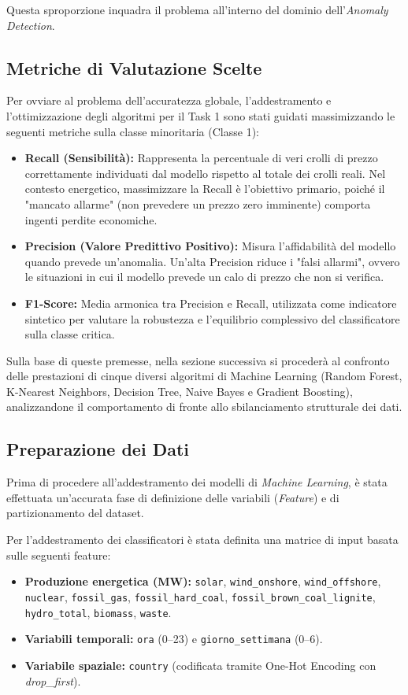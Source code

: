 Questa sproporzione inquadra il problema all'interno del dominio dell'\textit{Anomaly Detection}. 

\subsection{Metriche di Valutazione Scelte}
Per ovviare al problema dell'accuratezza globale, l'addestramento e l'ottimizzazione degli algoritmi per il Task 1 sono stati guidati massimizzando le seguenti metriche sulla classe minoritaria (Classe 1):

\begin{itemize}
    \item \textbf{Recall (Sensibilità):} Rappresenta la percentuale di veri crolli di prezzo correttamente individuati dal modello rispetto al totale dei crolli reali. Nel contesto energetico, massimizzare la Recall è l'obiettivo primario, poiché il "mancato allarme" (non prevedere un prezzo zero imminente) comporta ingenti perdite economiche.
    \item \textbf{Precision (Valore Predittivo Positivo):} Misura l'affidabilità del modello quando prevede un'anomalia. Un'alta Precision riduce i "falsi allarmi", ovvero le situazioni in cui il modello prevede un calo di prezzo che non si verifica.
    \item \textbf{F1-Score:} Media armonica tra Precision e Recall, utilizzata come indicatore sintetico per valutare la robustezza e l'equilibrio complessivo del classificatore sulla classe critica.
\end{itemize}

Sulla base di queste premesse, nella sezione successiva si procederà al confronto delle prestazioni di cinque diversi algoritmi di Machine Learning (Random Forest, K-Nearest Neighbors, Decision Tree, Naive Bayes e Gradient Boosting), analizzandone il comportamento di fronte allo sbilanciamento strutturale dei dati.

\subsection{Preparazione dei Dati}
\label{subsec:t1_prep_dati}

Prima di procedere all'addestramento dei modelli di \textit{Machine Learning}, è stata effettuata un'accurata fase di definizione delle variabili (\textit{Feature}) e di partizionamento del dataset.

Per l'addestramento dei classificatori è stata definita una matrice di input basata sulle seguenti feature:
\begin{itemize}
    \item \textbf{Produzione energetica (MW):} \texttt{solar}, \texttt{wind\_onshore}, \texttt{wind\_offshore}, \texttt{nuclear}, \texttt{fossil\_gas}, \texttt{fossil\_hard\_coal}, \texttt{fossil\_brown\_coal\_lignite}, \texttt{hydro\_total}, \texttt{biomass}, \texttt{waste}.
    \item \textbf{Variabili temporali:} \texttt{ora} (0--23) e \texttt{giorno\_settimana} (0--6).
    \item \textbf{Variabile spaziale:} \texttt{country} (codificata tramite One-Hot Encoding con \textit{drop\_first}).
\end{itemize}

